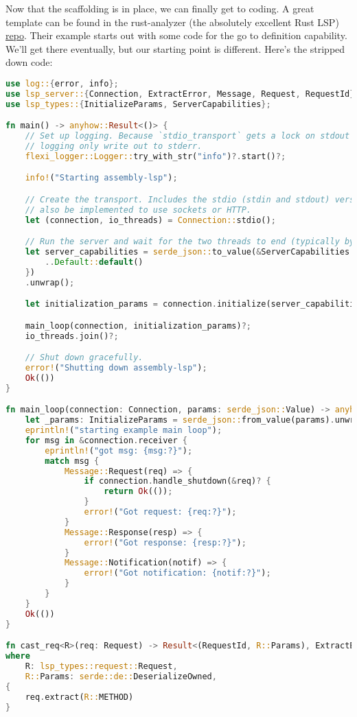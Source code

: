 Now that the scaffolding is in place, we can finally get to coding. A great template 
can be found in the rust-analyzer (the absolutely excellent Rust LSP) 
\href{https://github.com/rust-lang/rust-analyzer/tree/master/lib/lsp-server}{repo}. 
Their example starts out with some code for the go to definition capability. We'll 
get there eventually, but our starting point is different. Here's the stripped down code:

\begin{lstlisting}[language=rust]
use log::{error, info};
use lsp_server::{Connection, ExtractError, Message, Request, RequestId};
use lsp_types::{InitializeParams, ServerCapabilities};

fn main() -> anyhow::Result<()> {
    // Set up logging. Because `stdio_transport` gets a lock on stdout and stdin, we must have our
    // logging only write out to stderr.
    flexi_logger::Logger::try_with_str("info")?.start()?;

    info!("Starting assembly-lsp");

    // Create the transport. Includes the stdio (stdin and stdout) versions but this could
    // also be implemented to use sockets or HTTP.
    let (connection, io_threads) = Connection::stdio();

    // Run the server and wait for the two threads to end (typically by trigger LSP Exit event).
    let server_capabilities = serde_json::to_value(&ServerCapabilities {
        ..Default::default()
    })
    .unwrap();

    let initialization_params = connection.initialize(server_capabilities)?;

    main_loop(connection, initialization_params)?;
    io_threads.join()?;

    // Shut down gracefully.
    error!("Shutting down assembly-lsp");
    Ok(())
}

fn main_loop(connection: Connection, params: serde_json::Value) -> anyhow::Result<()> {
    let _params: InitializeParams = serde_json::from_value(params).unwrap();
    eprintln!("starting example main loop");
    for msg in &connection.receiver {
        eprintln!("got msg: {msg:?}");
        match msg {
            Message::Request(req) => {
                if connection.handle_shutdown(&req)? {
                    return Ok(());
                }
                error!("Got request: {req:?}");
            }
            Message::Response(resp) => {
                error!("Got response: {resp:?}");
            }
            Message::Notification(notif) => {
                error!("Got notification: {notif:?}");
            }
        }
    }
    Ok(())
}

fn cast_req<R>(req: Request) -> Result<(RequestId, R::Params), ExtractError<Request>>
where
    R: lsp_types::request::Request,
    R::Params: serde::de::DeserializeOwned,
{
    req.extract(R::METHOD)
}
\end{lstlisting}

